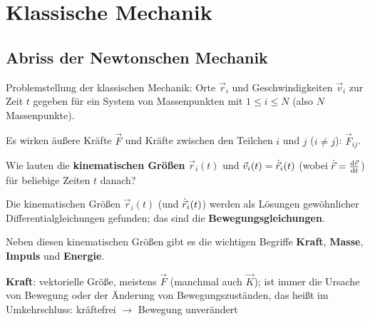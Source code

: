 \chapter{Klassische Mechanik}

\section{Abriss der Newtonschen Mechanik}

Problemstellung der klassischen Mechanik: Orte $\vec{r}_i$ und Geschwindigkeiten $\vec{v}_i$ zur Zeit $t$ gegeben für ein System von Massenpunkten mit $1 \le i \le N$ (also $N$ Massenpunkte).

Es wirken äußere Kräfte $\vec{F}$ und Kräfte zwischen den Teilchen $i$ und $j$ ($i \neq j$): $\vec{F}_{ij}$.

Wie lauten die \textbf{kinematischen Größen} $\vec{r}_i(t)$ und $\vec{v}_i(t) = \dot{\vec{r}}_i(t)$ (wobei $\dot{\vec{r}} = \frac{\mathrm{d}\vec{r}}{\mathrm{d}t}$) für beliebige Zeiten $t$ danach?

Die kinematischen Größen $\vec{r}_i(t)$ (und $\dot{\vec{r}}_i(t)$) werden als Lösungen gewöhnlicher Differentialgleichungen gefunden; das sind die \textbf{Bewegungsgleichungen}.

Neben diesen kinematischen Größen gibt es die wichtigen Begriffe \textbf{Kraft}, \textbf{Masse}, \textbf{Impuls} und \textbf{Energie}.


\textbf{Kraft}: vektorielle Größe, meistens $\vec{F}$ (manchmal auch $\vec{K}$); ist immer die Ursache von Bewegung oder der Änderung von Bewegungszuständen, das heißt im Umkehrschluss: kräftefrei $\rightarrow$ Bewegung unverändert 
	
